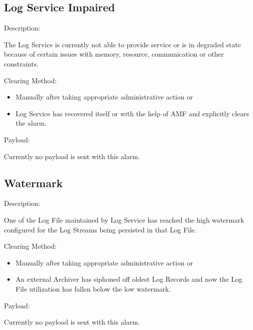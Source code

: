 \begin{flushleft}
\subsection{Log Service Impaired}
\begin{Desc}
\item[Description:]\end{Desc}
The Log Service is currently not able to provide service or is in degraded state because of certain issues with memory, resource, communication or 
other constraints.
\begin{Desc}
\item[Clearing Method:]\end{Desc}
\begin{itemize}
\item
Manually after taking appropriate administrative action or
\item
Log Service has recovered itself or with the help of AMF and explicitly clears the alarm.
\end{itemize}
\begin{Desc}
\item[Payload:]\end{Desc}
Currently no payload is sent with this alarm.




\subsection{Watermark}
\begin{Desc}
\item[Description:]\end{Desc}
One of the Log File maintained by Log Service has reached the high watermark configured for the Log Streams being persisted in that Log File.
\begin{Desc}
\item[Clearing Method:]\end{Desc}
\begin{itemize}
\item
Manually after taking appropriate administrative action or
\item
An external Archiver has siphoned off oldest Log Records and now the Log File utilization has fallen below the low watermark.\end{itemize}
\begin{Desc}
\item[Payload:]\end{Desc}
Currently no payload is sent with this alarm.



\end{flushleft}
